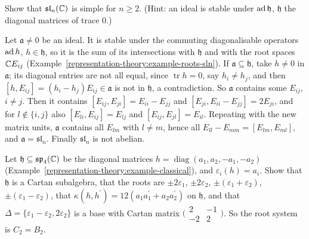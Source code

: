 \begin{exercise}\label{representation-theory:exercise-sln-simple}
Show that $\mathfrak{sl}_n(\mathbb{C})$ is simple for $n \geq 2$. (Hint: an ideal is stable under $\operatorname{ad}\mathfrak{h}$, $\mathfrak{h}$ the diagonal matrices of trace $0$.)
\end{exercise}

\begin{solution}
Let $\mathfrak{a} \neq 0$ be an ideal. It is stable under the commuting diagonalisable operators $\operatorname{ad} h$, $h \in \mathfrak{h}$, so it is the sum of its intersections with $\mathfrak{h}$ and
with the root spaces $\mathbb{C} E_{ij}$ (Example~\ref{representation-theory:example-roots-sln}). If $\mathfrak{a} \subseteq \mathfrak{h}$, take $h \neq 0$ in $\mathfrak{a}$; its diagonal entries are
not all equal, since $\operatorname{tr}h = 0$, say $h_i \neq h_j$, and then $[h, E_{ij}] = (h_i - h_j)E_{ij} \in \mathfrak{a}$ is not in $\mathfrak{h}$, a contradiction. So $\mathfrak{a}$
contains some $E_{ij}$, $i \neq j$. Then it contains $[E_{ij}, E_{ji}] = E_{ii} - E_{jj}$ and $[E_{ji}, E_{ii} - E_{jj}] = 2E_{ji}$, and for $l \notin \{i, j\}$ also $[E_{li}, E_{ij}] = E_{lj}$
and $[E_{ij}, E_{jl}] = E_{il}$. Repeating with the new matrix units, $\mathfrak{a}$ contains all $E_{lm}$ with $l \neq m$, hence all $E_{ll} - E_{mm} = [E_{lm}, E_{ml}]$, and
$\mathfrak{a} = \mathfrak{sl}_n$. Finally $\mathfrak{sl}_n$ is not abelian.
\end{solution}

\begin{exercise}\label{representation-theory:exercise-sp4-roots}
Let $\mathfrak{h} \subseteq \mathfrak{sp}_4(\mathbb{C})$ be the diagonal matrices $h = \operatorname{diag}(a_1, a_2, -a_1, -a_2)$ (Example~\ref{representation-theory:example-classical}), and
$\varepsilon_i(h) = a_i$. Show that $\mathfrak{h}$ is a Cartan subalgebra, that the roots are $\pm2\varepsilon_1$, $\pm2\varepsilon_2$, $\pm(\varepsilon_1 + \varepsilon_2)$,
$\pm(\varepsilon_1 - \varepsilon_2)$, that $\kappa(h, h^{\prime}) = 12(a_1a_1^{\prime} + a_2a_2^{\prime})$ on $\mathfrak{h}$, and that $\Delta = \{\varepsilon_1 - \varepsilon_2, 2\varepsilon_2\}$ is a base
with Cartan matrix $\bigl(\begin{smallmatrix}2 & -1\\ -2 & 2\end{smallmatrix}\bigr)$. So the root system is $C_2 = B_2$.
\end{exercise}

